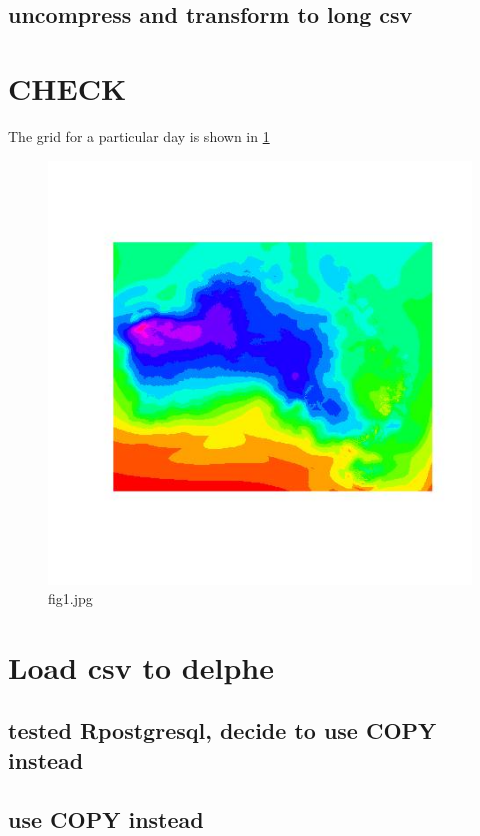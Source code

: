 \documentclass[a4paper]{article}
\begin{document}
\subsection{uncompress and transform to long csv}
\label{sec-4-3}
\section{CHECK}
\label{sec-5}




The grid for a particular day is shown in \ref{fig:fig1.jpg}
\begin{figure}[!h]
\centering
\includegraphics[width=\textwidth]{fig1.jpg}
\caption{fig1.jpg}
\label{fig:fig1.jpg}
\end{figure}
\section{Load csv to delphe}
\label{sec-6}
\subsection{tested Rpostgresql, decide to use COPY instead}
\label{sec-6-1}
\subsection{use COPY instead}
\label{sec-6-2}
\end{document}
